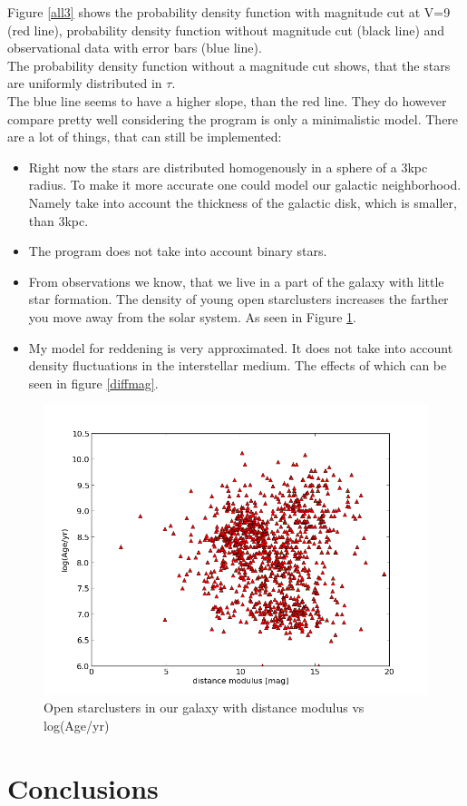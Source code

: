 \documentclass[a4paper,10pt]{article}
\begin{document}
 Figure \ref{all3} shows the probability density function with magnitude cut at V=9 (red line), probability density function without 
 magnitude cut (black line) and observational data with error bars (blue line).\\
 The probability density function without a magnitude cut shows, that the stars are uniformly distributed in $\tau$.\\
 The blue line seems to have a higher slope, than the red line. They do however compare pretty well 
 considering the program is only a minimalistic model. There are a lot of things, that can still be implemented:\\
 \begin{itemize}
  \item Right now the stars are distributed homogenously in a sphere of a 3kpc radius. To make it more accurate one could model our
  galactic neighborhood. Namely take into account the thickness of the galactic disk, which is smaller, than 3kpc.
  \item The program does not take into account binary stars. 
  \item From observations we know, that we live in a part of the galaxy with little star formation.  
  The density of young open starclusters increases the farther you move away from the solar system. As seen in Figure \ref{clusters}.
  \item My model for reddening is very approximated. It does not take into account density fluctuations in the interstellar medium. 
  The effects of which can be seen in figure \ref{diffmag}.
 \end{itemize}
 \begin{figure}[h!]
  \includegraphics[width=\textwidth]{clusters}
  \caption{Open starclusters in our galaxy with distance modulus vs log(Age/yr)  \label{clusters}}
 \end{figure}

 
 \section{Conclusions}
 
 
 
 
\end{document}
